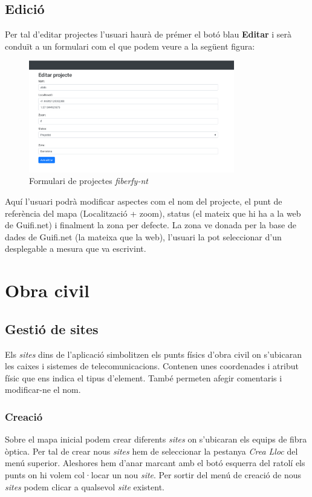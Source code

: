 \documentclass[a4paper]{article}
\begin{document}
	\subsection{Edició}
	Per tal d'editar projectes l'usuari haurà de prémer el botó blau \textbf{Editar} i serà conduït a un formulari com el que podem veure a la següent figura:
	
	\begin{figure}[H]
		\centering
		\includegraphics[width=0.8\textwidth]{images/project_edit_form.png}
		\caption{Formulari de projectes \emph{fiberfy-nt}}
	\end{figure}

	Aquí l'usuari podrà modificar aspectes com el nom del projecte, el punt de referència del mapa (Localització + zoom), status (el mateix que hi ha a la web de Guifi.net) i finalment la zona per defecte. La zona ve donada per la base de dades de Guifi.net (la mateixa que la web), l'usuari la pot seleccionar d'un desplegable a mesura que va escrivint.
	
	\section{Obra civil}
	\subsection{Gestió de sites}
	Els \emph{sites} dins de l'aplicació simbolitzen els punts físics d'obra civil on s'ubicaran les caixes i sistemes de telecomunicacions. Contenen unes coordenades i atribut físic que ens indica el tipus d'element. També permeten afegir comentaris i modificar-ne el nom.
	
	\subsubsection{Creació}
	Sobre el mapa inicial podem crear diferents \emph{sites} on s'ubicaran els equips de fibra òptica. Per tal de crear nous \emph{sites} hem de seleccionar la pestanya \emph{Crea Lloc} del menú superior. Aleshores hem d'anar marcant amb el botó esquerra del ratolí els punts on hi volem col·locar un nou \emph{site}. Per sortir del menú de creació de nous \emph{sites} podem clicar a qualsevol \emph{site} existent.
	
\end{document}
